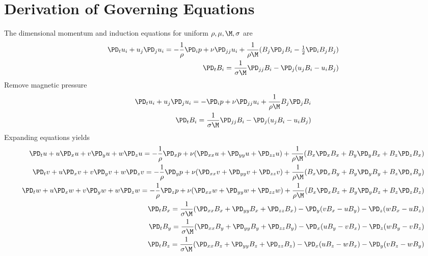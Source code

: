 \documentclass[11pt]{article}
\begin{document}
\doublespacing
\MOONSTITLE
\maketitle

\section{Derivation of Governing Equations}

The dimensional momentum and induction equations for uniform $\rho,\mu,\M,\sigma$ are
\begin{equation}\begin{aligned}
\PD_t u_i+u_j\PD_j u_i = - \frac{1}{\rho} \PD_i p+ \nu \PD_{jj} u_i + \frac{1}{\rho \M} (B_j \PD_j B_i - \tfrac{1}{2} \PD_i B_j B_j) \\
\PD_t B_i = \frac{1}{\sigma \M} \PD_{jj} B_i - \PD_j (u_j B_i - u_i B_j)
\end{aligned} \end{equation}
Remove magnetic pressure
\begin{equation}\begin{aligned}
\PD_t u_i+u_j\PD_j u_i = -\PD_i p+ \nu \PD_{jj} u_i + \frac{1}{\rho \M} B_j \PD_j B_i \\
\PD_t B_i = \frac{1}{\sigma \M} \PD_{jj} B_i - \PD_j (u_j B_i - u_i B_j)
\end{aligned} \end{equation}
Expanding equations yields
\small
\begin{equation}\begin{aligned}
\PD_t u+ u\PD_x u + v\PD_y u + w\PD_z u = -\frac{1}{\rho}\PD_x p+ \nu (\PD_{xx} u+\PD_{yy} u+\PD_{zz} u) + \frac{1}{\rho \M} (B_x \PD_x B_x + B_y \PD_y B_x + B_z \PD_z B_x) \\
\PD_t v+ u\PD_x v + v\PD_y v + w\PD_z v = -\frac{1}{\rho}\PD_y p+ \nu (\PD_{xx} v+\PD_{yy} v+\PD_{zz} v) + \frac{1}{\rho \M} (B_x \PD_x B_y + B_y \PD_y B_y + B_z \PD_z B_y) \\
\PD_t w+ u\PD_x w + v\PD_y w + w\PD_z w = -\frac{1}{\rho}\PD_z p+ \nu (\PD_{xx} w+\PD_{yy} w+\PD_{zz} w) + \frac{1}{\rho \M} (B_x \PD_x B_z + B_y \PD_y B_z + B_z \PD_z B_z) \\
\PD_t B_x = \frac{1}{\sigma \M} (\PD_{xx} B_x + \PD_{yy} B_x+\PD_{zz} B_x)                         - \PD_y (v B_x - u B_y) - \PD_z (w B_x - u B_z) \\
\PD_t B_y = \frac{1}{\sigma \M} (\PD_{xx} B_y + \PD_{yy} B_y+\PD_{zz} B_y) - \PD_x (u B_y - v B_x)                         - \PD_z (w B_y - v B_z) \\
\PD_t B_z = \frac{1}{\sigma \M} (\PD_{xx} B_z + \PD_{yy} B_z+\PD_{zz} B_z) - \PD_x (u B_z - w B_x) - \PD_y (v B_z - w B_y)                         \\
\end{aligned} \end{equation}
\end{document}
